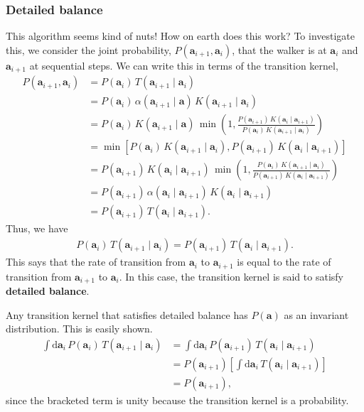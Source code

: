\subsubsection{Detailed balance}
This algorithm seems kind of nuts!  How on earth does this work?  To
investigate this, we consider the joint probability,
$P(\mathbf{a}_{i+1}, \mathbf{a}_i)$, that the walker is at
$\mathbf{a}_i$ and $\mathbf{a}_{i+1}$ at sequential steps.  We can
write this in terms of the transition kernel,
\begin{align}
P(\mathbf{a}_{i+1}, \mathbf{a}_i) &= P(\mathbf{a}_i)\,T(\mathbf{a}_{i+1}\mid \mathbf{a}_i) \nonumber \\
 &= P(\mathbf{a}_i)\,\alpha(\mathbf{a}_{i+1}\mid \mathbf{a})\,K(\mathbf{a}_{i+1}\mid \mathbf{a}_i) \nonumber \\
&= P(\mathbf{a}_i)\,K(\mathbf{a}_{i+1}\mid \mathbf{a})\,\min\left(1, \frac{P(\mathbf{a}_{i+1})\,K(\mathbf{a}_i\mid \mathbf{a}_{i+1})}
    {P(\mathbf{a}_i)\,K(\mathbf{a}_{i+1}\mid \mathbf{a}_i)}\right) \nonumber \\
&= \min\left[P(\mathbf{a}_i)\,K(\mathbf{a}_{i+1}\mid \mathbf{a}_i),
P(\mathbf{a}_{i+1})\,K(\mathbf{a}_i\mid \mathbf{a}_{i+1})\right] \nonumber \\
&= P(\mathbf{a}_{i+1})\,K(\mathbf{a}_i\mid \mathbf{a}_{i+1})\,\min\left(1,\frac{P(\mathbf{a}_i)\,K(\mathbf{a}_{i+1}\mid \mathbf{a}_i)}{P(\mathbf{a}_{i+1})\,K(\mathbf{a}_i\mid \mathbf{a}_{i+1})}\right) \nonumber \\
&= P(\mathbf{a}_{i+1})\, \alpha(\mathbf{a}_i\mid \mathbf{a}_{i+1})\,K(\mathbf{a}_i\mid \mathbf{a}_{i+1})\, \nonumber \\
&= P(\mathbf{a}_{i+1})\, T(\mathbf{a}_i\mid \mathbf{a}_{i+1}).
\end{align}
Thus, we have
\begin{align}
P(\mathbf{a}_i)\,T(\mathbf{a}_{i+1}\mid \mathbf{a}_i) = P(\mathbf{a}_{i+1})\, T(\mathbf{a}_i\mid \mathbf{a}_{i+1}).
\end{align}
This says that the rate of transition from $\mathbf{a}_i$ to
$\mathbf{a}_{i+1}$ is equal to the rate of transition from
$\mathbf{a}_{i+1}$ to $\mathbf{a}_i$.  In this case, the transition
kernel is said to satisfy \textbf{detailed balance}.

Any transition kernel that satisfies detailed balance has
$P(\mathbf{a})$ as an invariant distribution.  This is easily shown.
\begin{align}
\int \mathrm{d}\mathbf{a}_i \,P(\mathbf{a}_i)\,T(\mathbf{a}_{i+1}\mid \mathbf{a}_i)
&= \int \mathrm{d}\mathbf{a}_i\,P(\mathbf{a}_{i+1})\, T(\mathbf{a}_i\mid \mathbf{a}_{i+1}) \nonumber \\
&= P(\mathbf{a}_{i+1})\left[\int \mathrm{d}\mathbf{a}_i\, T(\mathbf{a}_i\mid \mathbf{a}_{i+1})\right] \nonumber \\
&= P(\mathbf{a}_{i+1}),
\end{align}
since the bracketed term is unity because the transition kernel is a
probability.


